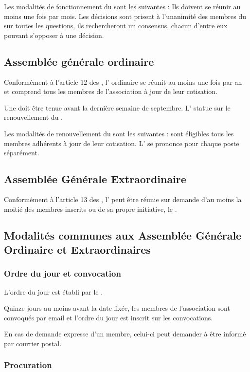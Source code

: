 \documentclass[a4paper,french,10pt]{article}
\begin{document}
Les modalités de fonctionnement du \bureau{} sont les suivantes : Ils
doivent se réunir au moins une fois par mois. Les décisions sont
prisent à l'unanimité des membres du \bureau{} sur toutes les questions,
ils rechercheront un consensus, chacun d’entre eux pouvant s’opposer à
une décision.

\subsection{Assemblée générale ordinaire}
Conformément à l'article 12 des \statuts{}, l’\AG{} ordinaire se réunit au moins une fois par an et comprend tous les membres de l’association à jour de leur cotisation.

Une \AG{} doit être tenue avant la dernière semaine de septembre. L'\AG{} statue sur le renouvellement du \bureau{}.

Les modalités de renouvellement du \bureau{} sont les suivantes : sont éligibles tous les membres adhérents à jour de leur cotisation. L'\AG{} se prononce pour chaque poste séparément.

\subsection{Assemblée Générale Extraordinaire}
\label{sec:age}
Conformément à l'article 13 des \statuts{}, l'\AGE{} peut être réunie sur demande d'au moins la moitié des membres inscrits ou de sa propre initiative, le \bureau{}.

\subsection{Modalités communes aux Assemblée Générale Ordinaire et Extraordinaires}
\label{sec:ag}

\subsubsection*{Ordre du jour et convocation}
\label{sec:ordre-du-jour-1}

L'ordre du jour est établi par le \bureau{}.

Quinze jours au moins avant la date fixée, les membres de
l’association sont convoqués par email et l’ordre du jour est inscrit
sur les convocations.

En cas de demande expresse d'un membre, celui-ci peut demander à être
informé par courrier postal.

\subsubsection*{Procuration}
\label{sec:procuration}
\end{document}
